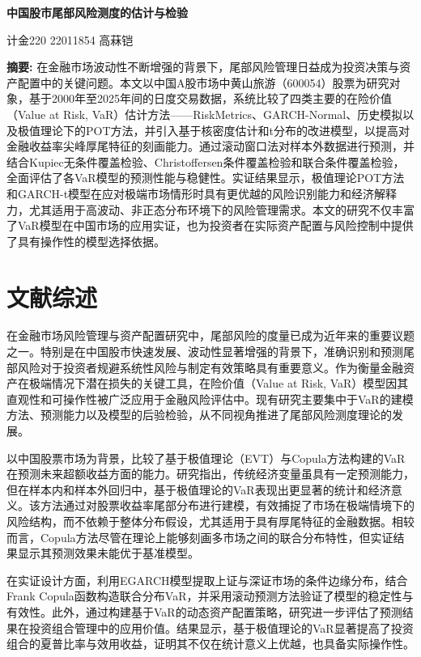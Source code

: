 \documentclass[12pt, a4paper]{article}
\begin{document}
\begin{center}
\LARGE\textbf{中国股市尾部风险测度的估计与检验}

\vspace{1cm}
\large 计金220 22011854 高菻铠
\end{center}

\noindent \textbf{摘要:} 在金融市场波动性不断增强的背景下，尾部风险管理日益成为投资决策与资产配置中的关键问题。本文以中国A股市场中黄山旅游（600054）股票为研究对象，基于2000年至2025年间的日度交易数据，系统比较了四类主要的在险价值（Value at Risk, VaR）估计方法——RiskMetrics、GARCH-Normal、历史模拟以及极值理论下的POT方法，并引入基于核密度估计和t分布的改进模型，以提高对金融收益率尖峰厚尾特征的刻画能力。通过滚动窗口法对样本外数据进行预测，并结合Kupiec无条件覆盖检验、Christoffersen条件覆盖检验和联合条件覆盖检验，全面评估了各VaR模型的预测性能与稳健性。实证结果显示，极值理论POT方法和GARCH-t模型在应对极端市场情形时具有更优越的风险识别能力和经济解释力，尤其适用于高波动、非正态分布环境下的风险管理需求。本文的研究不仅丰富了VaR模型在中国市场的应用实证，也为投资者在实际资产配置与风险控制中提供了具有操作性的模型选择依据。

\section{文献综述}

在金融市场风险管理与资产配置研究中，尾部风险的度量已成为近年来的重要议题之一。特别是在中国股市快速发展、波动性显著增强的背景下，准确识别和预测尾部风险对于投资者规避系统性风险与制定有效策略具有重要意义。作为衡量金融资产在极端情况下潜在损失的关键工具，在险价值（Value at Risk, VaR）模型因其直观性和可操作性被广泛应用于金融风险评估中。现有研究主要集中于VaR的建模方法、预测能力以及模型的后验检验，从不同视角推进了尾部风险测度理论的发展。

\citet{chen2014var}以中国股票市场为背景，比较了基于极值理论（EVT）与Copula方法构建的VaR在预测未来超额收益方面的能力。研究指出，传统经济变量虽具有一定预测能力，但在样本内和样本外回归中，基于极值理论的VaR表现出更显著的统计和经济意义。该方法通过对股票收益率尾部分布进行建模，有效捕捉了市场在极端情境下的风险结构，而不依赖于整体分布假设，尤其适用于具有厚尾特征的金融数据。相较而言，Copula方法尽管在理论上能够刻画多市场之间的联合分布特性，但实证结果显示其预测效果未能优于基准模型。

在实证设计方面，\citet{chen2014var}利用EGARCH模型提取上证与深证市场的条件边缘分布，结合Frank Copula函数构造联合分布VaR，并采用滚动预测方法验证了模型的稳定性与有效性。此外，通过构建基于VaR的动态资产配置策略，研究进一步评估了预测结果在投资组合管理中的应用价值。结果显示，基于极值理论的VaR显著提高了投资组合的夏普比率与效用收益，证明其不仅在统计意义上优越，也具备实际操作性。
\end{document}
